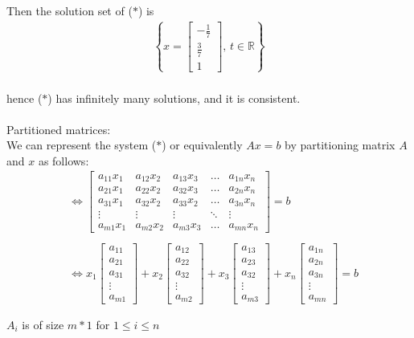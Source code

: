 \documentclass{jhwhw}
\begin{document}
Then the solution set of (\(\ast\)) is\\

\begin{align*} \left\{ x=\begin{bmatrix} -\frac{1}{7} \\ \frac{3}{7} \\ 1 \end{bmatrix}, \, t \in \mathbb{R} \right\} \end{align*}\\
hence (\(\ast\)) has infinitely many solutions, and it is consistent.\\ \\

Partitioned matrices:\\
We can represent the system (\(\ast\)) or equivalently \(Ax=b\) by partitioning matrix \(A\) and \(x\) as follows:\\

\begin{align*} &\Leftrightarrow \begin{bmatrix} a_{11}x_1 & a_{12}x_2 & a_{13}x_3 & \ldots & a_{1n}x_n \\ a_{21}x_1 & a_{22}x_2 & a_{32}x_3 & \ldots & a_{2n}x_n \\ a_{31}x_1 & a_{32}x_2 & a_{33}x_2 & \ldots & a_{3n}x_n \\ \vdots & \vdots & \vdots & \ddots & \vdots \\ a_{m1}x_1 & a_{m2}x_2 & a_{m3}x_3 & \ldots & a_{mn}x_n \end{bmatrix} = b \\ \\
&\Leftrightarrow x_1 \begin{bmatrix} a_{11} \\ a_{21} \\ a_{31} \\ \vdots \\ a_{m1} \end{bmatrix} + x_2 \begin{bmatrix} a_{12} \\ a_{22} \\ a_{32} \\ \vdots \\ a_{m2} \end{bmatrix} + x_3 \begin{bmatrix} a_{13} \\ a_{23} \\ a_{32} \\ \vdots \\ a_{m3} \end{bmatrix} + x_n \begin{bmatrix} a_{1n} \\ a_{2n} \\ a_{3n} \\ \vdots \\ a_{mn} \end{bmatrix} = b \\ \\
\end{align*}
\(A_i\) is of size \(m*1\) for \(1 \leq i \leq n\)\\
\end{document}
